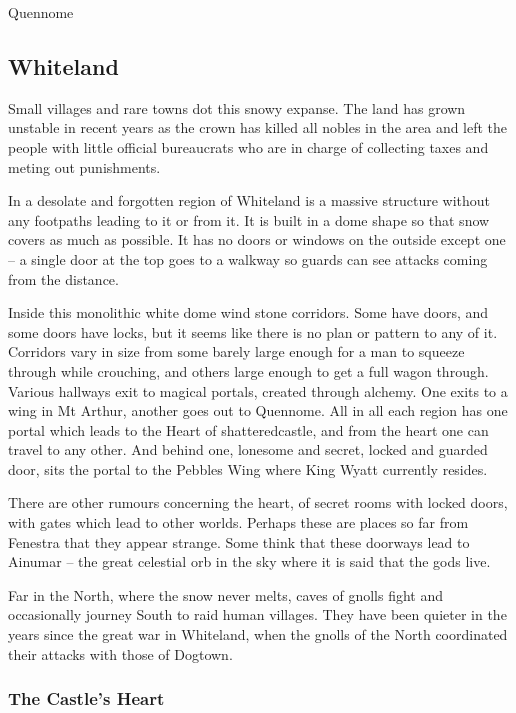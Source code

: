 \begin{multicols}{2}
\begin{encounters}{Quennome}
\end{encounters}

\subsection{Whiteland}

Small villages and rare towns dot this snowy expanse.  The land has grown unstable in recent years as the crown has killed all nobles in the area and left the people with little official bureaucrats who are in charge of collecting taxes and meting out punishments.

In a desolate and forgotten region of Whiteland is a massive structure without any footpaths leading to it or from it.
It is built in a dome shape so that snow covers as much as possible.
It has no doors or windows on the outside except one -- a single door at the top goes to a walkway so guards can see attacks coming from the distance.

Inside this monolithic white dome wind stone corridors.  Some have doors, and some doors have locks, but it seems like there is no plan or pattern to any of it.  Corridors vary in size from some barely large enough for a man to squeeze through while crouching, and others large enough to get a full wagon through.  Various hallways exit to magical portals, created through alchemy.  One exits to a wing in Mt Arthur, another goes out to Quennome.  All in all each region has one portal which leads to the Heart of \gls{shatteredcastle}, and from the heart one can travel to any other.  And behind one, lonesome and secret, locked and guarded door, sits the portal to the Pebbles Wing where King Wyatt currently resides.

There are other rumours concerning the heart, of secret rooms with locked doors, with gates which lead to other worlds.  Perhaps these are places so far from Fenestra that they appear strange.  Some think that these doorways lead to Ainumar -- the great celestial orb in the sky where it is said that the gods live.

Far in the North, where the snow never melts, caves of gnolls fight and occasionally journey South to raid human villages.  They have been quieter in the years since the great war in Whiteland, when the gnolls of the North coordinated their attacks with those of Dogtown.

\subsubsection{The Castle's Heart}\label{whiteland_heart}


\end{multicols}
